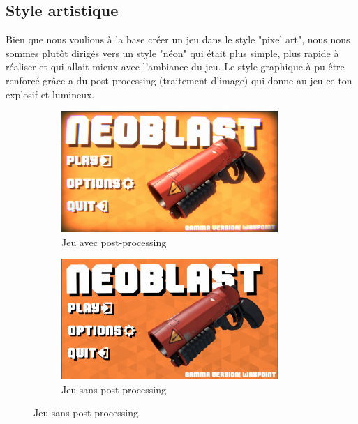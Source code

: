 \documentclass[a4paper]{article}
\begin{document}
\subsection{Style artistique}
Bien que nous voulions à la base créer un jeu dans le style "pixel art", nous nous sommes plutôt dirigés vers un style "néon" qui était plus simple, plus rapide à réaliser et qui allait mieux avec l'ambiance du jeu. Le style graphique à pu être renforcé grâce a du post-processing (traitement d'image) qui donne au jeu ce ton explosif et lumineux.

\begin{figure}[h]
    \begin{subfigure}{0.5\textwidth}
        \includegraphics[width=0.9\textwidth]{images/game/start_menu.png}
        \caption{Jeu avec post-processing}
        \label{fig:post_processing}
    \end{subfigure}
        \begin{subfigure}{0.5\textwidth}
        \includegraphics[width=0.9\textwidth]{images/game/no_postfx.png}
        \caption{Jeu sans post-processing}
        \label{fig:no_post_processing}
    \end{subfigure}
\end{figure}
\end{document}
